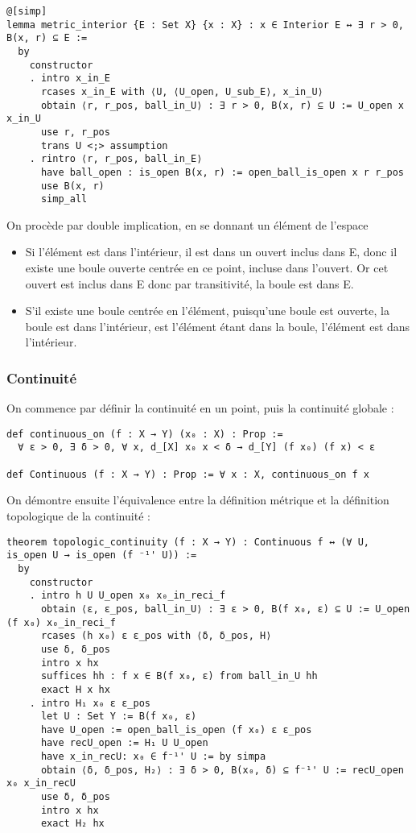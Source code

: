 \documentclass[a4paper, 12pt]{article}
\begin{document}
\begin{verbatim}
@[simp]
lemma metric_interior {E : Set X} {x : X} : x ∈ Interior E ↔ ∃ r > 0, B(x, r) ⊆ E :=
  by
    constructor
    . intro x_in_E
      rcases x_in_E with ⟨U, ⟨U_open, U_sub_E⟩, x_in_U⟩
      obtain ⟨r, r_pos, ball_in_U⟩ : ∃ r > 0, B(x, r) ⊆ U := U_open x x_in_U
      use r, r_pos
      trans U <;> assumption
    . rintro ⟨r, r_pos, ball_in_E⟩
      have ball_open : is_open B(x, r) := open_ball_is_open x r r_pos
      use B(x, r)
      simp_all
\end{verbatim}

On procède par double implication, en se donnant un élément de l'espace
\begin{itemize}
    \item Si l'élément est dans l'intérieur, il est dans un ouvert inclus dans E, donc il existe une boule ouverte centrée en ce point, incluse dans l'ouvert. Or cet ouvert est inclus dans E donc par transitivité, la boule est dans E.
    \item S'il existe une boule centrée en l'élément, puisqu'une boule est ouverte, la boule est dans l'intérieur, est l'élément étant dans la boule, l'élément est dans l'intérieur.
\end{itemize}

\subsubsection{Continuité}

On commence par définir la continuité en un point, puis la continuité globale :

\begin{verbatim}
def continuous_on (f : X → Y) (x₀ : X) : Prop :=
  ∀ ε > 0, ∃ δ > 0, ∀ x, d_[X] x₀ x < δ → d_[Y] (f x₀) (f x) < ε

def Continuous (f : X → Y) : Prop := ∀ x : X, continuous_on f x
\end{verbatim}

On démontre ensuite l'équivalence entre la définition métrique et la définition topologique de la continuité :

\begin{verbatim}
theorem topologic_continuity (f : X → Y) : Continuous f ↔ (∀ U, is_open U → is_open (f ⁻¹' U)) :=
  by
    constructor
    . intro h U U_open x₀ x₀_in_reci_f
      obtain ⟨ε, ε_pos, ball_in_U⟩ : ∃ ε > 0, B(f x₀, ε) ⊆ U := U_open (f x₀) x₀_in_reci_f
      rcases (h x₀) ε ε_pos with ⟨δ, δ_pos, H⟩
      use δ, δ_pos
      intro x hx
      suffices hh : f x ∈ B(f x₀, ε) from ball_in_U hh
      exact H x hx
    . intro H₁ x₀ ε ε_pos
      let U : Set Y := B(f x₀, ε)
      have U_open := open_ball_is_open (f x₀) ε ε_pos
      have recU_open := H₁ U U_open
      have x_in_recU: x₀ ∈ f⁻¹' U := by simpa
      obtain ⟨δ, δ_pos, H₂⟩ : ∃ δ > 0, B(x₀, δ) ⊆ f⁻¹' U := recU_open x₀ x_in_recU
      use δ, δ_pos
      intro x hx
      exact H₂ hx
\end{verbatim}
\end{document}
